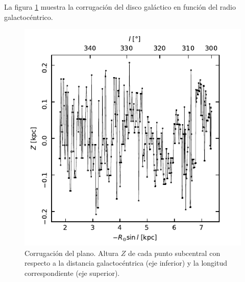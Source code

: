 La figura \ref{fig:Z} muestra la corrugación del disco galáctico en función del radio galactocéntrico.

\begin{figure}[htbp]
	\includegraphics{rsc/Z.pdf}
	\caption{Corrugación del plano. Altura $Z$ de cada punto subcentral con respecto a la distancia galactocéntrica (eje inferior) y la longitud correspondiente (eje superior).}
	\label{fig:Z}
\end{figure}
